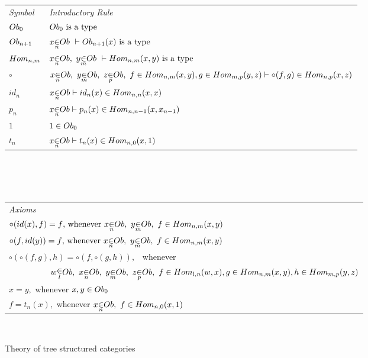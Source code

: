 \begin{figure}[H]
\caption{Theory of tree structured categories}
\label{theoryoftreestructuredcategories}

\newcommand{\Obi}[1]{\Ob_{#1}}
\newcommand{\Homij}[2]{\Hom_{#1,#2}}
\newcommand{\ofObi}[2]{#1 \bbin{#2}{\Ob}}
\newcommand{\HomijBar}[4]{\Homij{#1}{#2}(#3,#4)}
\newcommand{\ofHomij}[5]{\ofT{#1}{\HomijBar{#2}{#3}{#4}{#5}}}
\newcommand{\HomijBarFt}[4]{\Homij{#1}{#2}(#3,\ft{#4})}
\newcommand{\ofHomiBarFt}[4]{\ofT{#1}{\HomijBarFt{#2}{#2-1}{#3}{#4}}}

\begin{tabular}{>{\itshape}l l}
Symbol & \itshape{Introductory Rule} \\[0.1cm]
$\Obi{0}  $&$\isT{\Obi{0}}$\\[0.2cm]
$\Obi{n+1} $&$\ofTn{x}{n}{\Ob} \    \tstyle \isT{\Obi{n+1}(x)} $\\ [0.25cm]
$\Homij{n}{m} $ &$\ofObi{x}{n} ,\  \ofObi{y}{m} \ \tstyle \isT{\HomijBar{n}{m}{x}{y}} $\\ [0.25cm]
$\circ$ & $\ofObi{x}{n}, \  \ofObi{y}{m}, \ \ofObi{z}{p}, \ \ofHomij{f}{n}{m}{x}{y},\ofHomij{g}{m}{p}{y}{z} \tstyle \ofHomij{\circ(f,g)}{n}{p}{x}{z}$ \\ [0.25cm]
$id_n   $   & $ \ofObi{x}{n} \tstyle \ofHomij{id_n(x)}{n}{n}{x}{x} $\\ [0.25cm]
$p_n   $   & $ \ofObi{x}{n} \tstyle \ofHomij{p_n(x)}{n}{n-1}{x}{x_{n-1}} $\\ [0.25cm]
$1     $   & $\ofT{1}\Obi{0} $\\         [0.25cm]
$t_n   $   & $ \ofObi{x}{n} \tstyle t_n(x) \in \Homij{n}{0}(x,1)$\\ [0.25cm]
\end{tabular} \\
\vspace{.1cm}  \\
\vspace{.03cm} \\
\begin{tabular}{l}
\itshape{Axioms} \\

$\circ(id(x),f)=f \mbox{,  whenever\ } \ofObi{x}{n} ,\  \ofObi{y}{m} , \ \ofHomij{f}{n}{m}{x}{y}  $\\ [0.25cm]
$\circ(f,id(y))=f \mbox{,  whenever\ } \ofObi{x}{n} ,\  \ofObi{y}{m} , \ \ofHomij{f}{n}{m}{x}{y}  $\\ [0.25cm]
$ \circ(\circ(f,g),h) = \circ(f,\circ(g,h)),$ \ whenever \\ [0.2cm]
$ \ \ \ \ \ \ \ \ \ \ \ \ \ \ \ 
\ofObi{w}{l} , \ \ofObi{x}{n} , \ \ofObi{y}{m} , \ \ofObi{z}{p}, \ 
 \ofHomij{f}{l}{n}{w}{x}, \ofHomij{g}{n}{m}{x}{y}, \ofHomij{h}{m}{p}{y}{z}$ \\ [0.25cm]
$x = y, $ whenever $x,y \in \Obi{0} $ \\ [0.25cm]
$f = t_n(x),  $ whenever $ \ofObi{x}{n}, \ f \in \Homij{n}{0}(x,1)$\\ [0.25cm]
\end{tabular}  \\
\end{figure}
